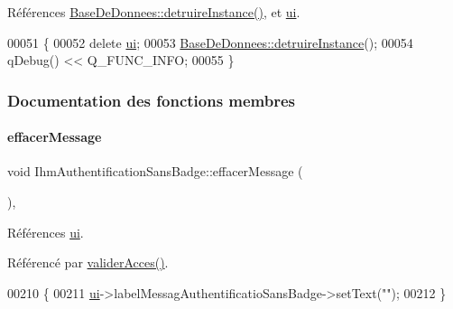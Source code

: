 Références \hyperlink{class_base_de_donnees_a457401c0816b888c77ce915997545f4e}{Base\+De\+Donnees\+::detruire\+Instance()}, et \hyperlink{class_ihm_authentification_sans_badge_a95e8a9d049b6e5f262b45e3362d2bbee}{ui}.


\begin{DoxyCode}
00051 \{
00052     \textcolor{keyword}{delete} \hyperlink{class_ihm_authentification_sans_badge_a95e8a9d049b6e5f262b45e3362d2bbee}{ui};
00053     \hyperlink{class_base_de_donnees_a457401c0816b888c77ce915997545f4e}{BaseDeDonnees::detruireInstance}();
00054     qDebug() << Q\_FUNC\_INFO;
00055 \}
\end{DoxyCode}


\subsubsection{Documentation des fonctions membres}
\mbox{\label{class_ihm_authentification_sans_badge_a6dfdc8197ea602634455e80b35af7c87}} 
\paragraph{\texorpdfstring{effacer\+Message}{effacerMessage}}
{\footnotesize\ttfamily void Ihm\+Authentification\+Sans\+Badge\+::effacer\+Message (\begin{DoxyParamCaption}{ }\end{DoxyParamCaption})\hspace{0.3cm}{\ttfamily [private]}, {\ttfamily [slot]}}



Références \hyperlink{class_ihm_authentification_sans_badge_a95e8a9d049b6e5f262b45e3362d2bbee}{ui}.



Référencé par \hyperlink{class_ihm_authentification_sans_badge_a1d6f062da30edd3ba8fe74906e8f16cf}{valider\+Acces()}.


\begin{DoxyCode}
00210 \{
00211     \hyperlink{class_ihm_authentification_sans_badge_a95e8a9d049b6e5f262b45e3362d2bbee}{ui}->labelMessagAuthentificatioSansBadge->setText(\textcolor{stringliteral}{""});
00212 \}
\end{DoxyCode}
\mbox{\label{class_ihm_authentification_sans_badge_a17b178accdfe141a7e27fa1888bebcbc}} 
